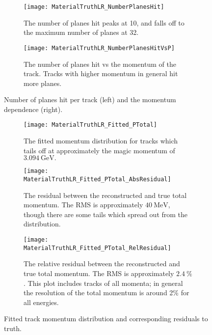     \begin{figure}[]
    \centering
        \begin{subfigure}[t]{0.45\textwidth}
            \centering
            \texttt{[image: MaterialTruthLR\_NumberPlanesHit]}
            \caption{The number of planes hit peaks at 10, and falls off to the maximum number of planes at 32.}
        \end{subfigure}
        \hspace{5mm}
        \begin{subfigure}[t]{0.45\textwidth}
            \centering
            \texttt{[image: MaterialTruthLR\_NumberPlanesHitVsP]}
            \caption{The number of planes hit vs the momentum of the track. Tracks with higher momentum in general hit more planes.}
        \end{subfigure}
    \caption[Number of planes hit for fitted tracks]{Number of planes hit per track (left) and the momentum dependence (right).}
    \label{fig:NumberOfPlanesHit}
    \end{figure}


    \begin{figure}[]
    \centering
        \begin{subfigure}[t]{0.6\textwidth}
            \centering
            \texttt{[image: MaterialTruthLR\_Fitted\_PTotal]}
            \caption{The fitted momentum distribution for tracks which tails off at approximately the magic momentum of $\SI{3.094}{\GeV}.$}
        \end{subfigure}%

        \vspace{2mm}
        \begin{subfigure}[t]{0.45\textwidth}
            \centering
            \texttt{[image: MaterialTruthLR\_Fitted\_PTotal\_AbsResidual]}
            \caption{The residual between the reconstructed and true total momentum. The RMS is approximately $\SI{40}{\MeV}$, though there are some tails which spread out from the distribution.}
        \end{subfigure}
        \hspace{5mm}
        \begin{subfigure}[t]{0.45\textwidth}
            \centering
            \texttt{[image: MaterialTruthLR\_Fitted\_PTotal\_RelResidual]}
            \caption{The relative residual between the reconstructed and true total momentum. The RMS is approximately $\SI{2.4}{\%}$. This plot includes tracks of all momenta; in general the resolution of the total momentum is around 2\% for all energies.}
        \end{subfigure}%
    \caption[Fitted track momentum distribution and corresponding residuals to truth]{Fitted track momentum distribution and corresponding residuals to truth.}
    \label{fig:MaterialTotalMomentum}
    \end{figure}


